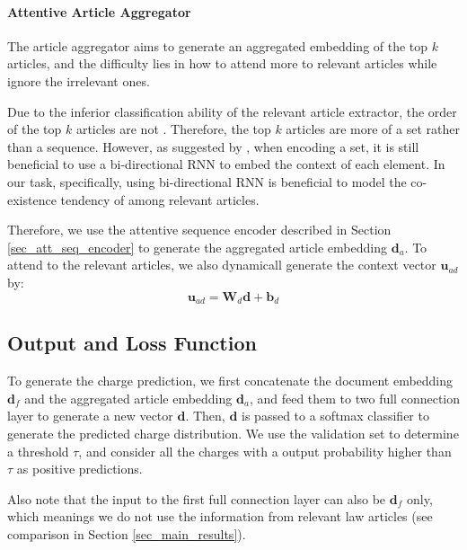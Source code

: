 \paragraph{Attentive Article Aggregator}
The article aggregator aims to generate an aggregated embedding of the top $k$ articles, and the difficulty lies in how to attend more to relevant articles while ignore the irrelevant ones. 

Due to the inferior classification ability of the relevant article extractor, the order of the top $k$ articles are not . Therefore, the top $k$ articles are more of a set rather than a sequence. However, as suggested by \cite{vinyals2016matching}, when encoding a set, it is still beneficial to use a bi-directional RNN to embed the context of each element.
In our task, specifically, using bi-directional RNN is beneficial to model the co-existence tendency of among relevant articles.

Therefore, we use the attentive sequence encoder described in Section \ref{sec_att_seq_encoder} to generate the aggregated article embedding $\mathbf{d}_a$. To attend to the relevant articles, we also dynamicall generate the context vector $\mathbf{u}_{ad}$ by:
\begin{equation}
\mathbf{u}_{ad} = \mathbf{W}_d \mathbf{d} + \mathbf{b}_d
\end{equation}


\subsection{Output and Loss Function}
To generate the charge prediction, we first concatenate the document embedding $\mathbf{d}_f$ and the aggregated article embedding $\mathbf{d}_a$, and feed them to two full connection layer to generate a new vector $\mathbf{d}$. Then, $\mathbf{d}$ is passed to a softmax classifier to generate the predicted charge distribution. We use the validation set to determine a threshold $\tau$, and consider all the charges with a output probability higher than $\tau$ as positive predictions.

Also note that the input to the first full connection layer can also be $\mathbf{d}_f$ only, which meanings we do not use the information from relevant law articles (see comparison in Section \ref{sec_main_results}). 

